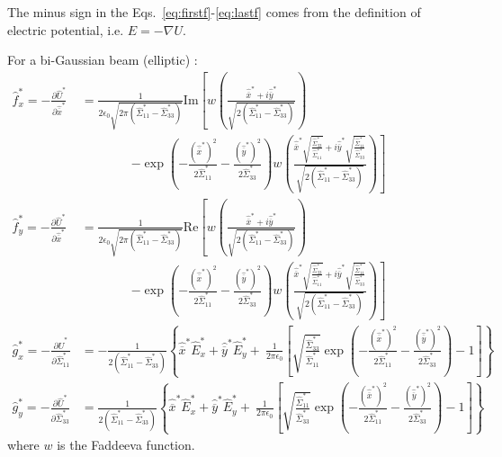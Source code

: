 The minus sign in the Eqs.~\ref{eq:firstf}-\ref{eq:lastf} comes from the definition of electric potential, i.e. $E=-\nabla U$.


For a bi-Gaussian beam (elliptic) \cite{hirata}:
\begin{align}
\hat{f}^*_x = -\frac{\partial \hat{U}^*}{\partial \hat{\overline{x}}^*} &= \frac{1}{2 \epsilon_0 \sqrt{2 \pi \left(\hat{\Sigma}^*_{11}-\hat{\Sigma}^*_{33}\right)}} \textrm{Im} \left[w\left(\frac{\hat{\overline{x}}^*+i \hat{\overline{y}}^*}{\sqrt{2 \left(\hat{\Sigma}^*_{11}-\hat{\Sigma}^*_{33}\right)}}\right) \right.
\nonumber \\
&\qquad\qquad\left.
- \exp \left(-\frac{(\hat{\overline{x}}^*)^2}{2\hat{\Sigma}^*_{11}}-\frac{(\hat{\overline{y}}^*)^2}{2\hat{\Sigma}^*_{33}}\right) w\left(\frac{\hat{\overline{x}}^*\sqrt{\frac{\hat{\Sigma}^*_{33}}{\hat{\Sigma}^*_{11}}}+i \hat{\overline{y}}^*\sqrt{\frac{\hat{\Sigma}^*_{11}}{\hat{\Sigma}^*_{33}}}}{\sqrt{2 \left(\hat{\Sigma}^*_{11}-\hat{\Sigma}^*_{33}\right)}}\right)
\right]\\
\hat{f}^*_y  = -\frac{\partial \hat{U}^*}{\partial \hat{\overline{x}}^*} &= \frac{1}{2 \epsilon_0 \sqrt{2 \pi \left(\hat{\Sigma}^*_{11}-\hat{\Sigma}^*_{33}\right)}} \textrm{Re} \left[w\left(\frac{\hat{\overline{x}}^*+i \hat{\overline{y}}^*}{\sqrt{2 \left(\hat{\Sigma}^*_{11}-\hat{\Sigma}^*_{33}\right)}}\right) \right.
\nonumber \\
&\qquad\qquad\left.
- \exp \left(-\frac{(\hat{\overline{x}}^*)^2}{2\hat{\Sigma}^*_{11}}-\frac{(\hat{\overline{y}}^*)^2}{2\hat{\Sigma}^*_{33}}\right) w\left(\frac{\hat{\overline{x}}^*\sqrt{\frac{\hat{\Sigma}^*_{33}}{\hat{\Sigma}^*_{11}}}+i \hat{\overline{y}}^*\sqrt{\frac{\hat{\Sigma}^*_{11}}{\hat{\Sigma}^*_{33}}}}{\sqrt{2 \left(\hat{\Sigma}^*_{11}-\hat{\Sigma}^*_{33}\right)}}\right)
\right]\\
\hat{g}^*_x = -\frac{\partial \hat{U}^*}{\partial \hat{\Sigma}^*_{11}} &= -\frac{1}{2 \left(\hat{\Sigma}^*_{11}-\hat{\Sigma}^*_{33}\right)}
 \left\{\hat{\overline{x}}^* \hat{E}^*_x  + \hat{\overline{y}}^* \hat{E}^*_y +\
 \frac{1}{2 \pi \epsilon_0}\left[\sqrt{\frac{\hat{\Sigma}^*_{33}}{\hat{\Sigma}^*_{11}}}  \exp \left(-\frac{(\hat{\overline{x}}^*)^2}{2\hat{\Sigma}^*_{11}}-\frac{(\hat{\overline{y}}^*)^2}{2\hat{\Sigma}^*_{33}}\right)   -1 \right]\right\}\\
\hat{g}^*_y =  -\frac{\partial \hat{U}^*}{\partial \hat{\Sigma}^*_{33}} &= \frac{1}{2 \left(\hat{\Sigma}^*_{11}-\hat{\Sigma}^*_{33}\right)}
 \left\{\hat{\overline{x}}^* \hat{E}^*_x  + \hat{\overline{y}}^* \hat{E}^*_y +\
 \frac{1}{2 \pi \epsilon_0}\left[\sqrt{\frac{\hat{\Sigma}^*_{11}}{\hat{\Sigma}^*_{33}}}  \exp \left(-\frac{(\hat{\overline{x}}^*)^2}{2\hat{\Sigma}^*_{11}}-\frac{(\hat{\overline{y}}^*)^2}{2\hat{\Sigma}^*_{33}}\right)   -1 \right]\right\}
\end{align}
where $w$ is the Faddeeva function.
 
